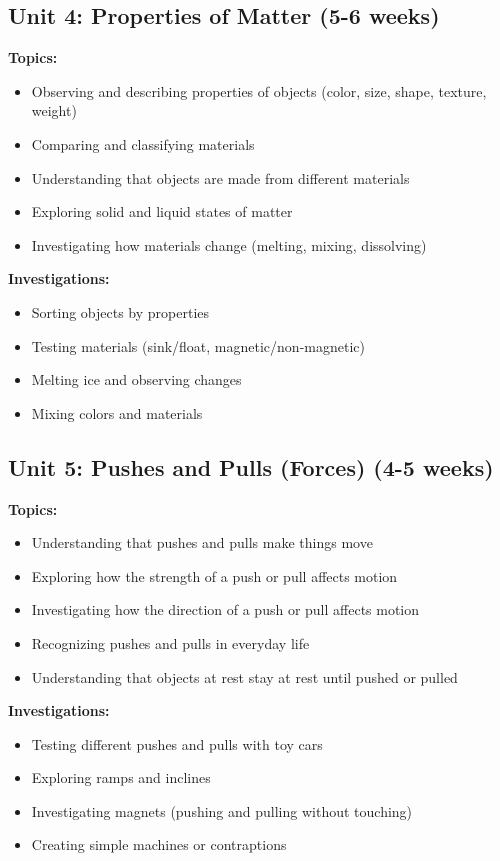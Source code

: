 \documentclass[11pt,letterpaper]{report}
\begin{document}
\subsection{Unit 4: Properties of Matter (5-6 weeks)}

\textbf{Topics:}
\begin{itemize}
    \item Observing and describing properties of objects (color, size, shape, texture, weight)
    \item Comparing and classifying materials
    \item Understanding that objects are made from different materials
    \item Exploring solid and liquid states of matter
    \item Investigating how materials change (melting, mixing, dissolving)
\end{itemize}

\textbf{Investigations:}
\begin{itemize}
    \item Sorting objects by properties
    \item Testing materials (sink/float, magnetic/non-magnetic)
    \item Melting ice and observing changes
    \item Mixing colors and materials
\end{itemize}

\subsection{Unit 5: Pushes and Pulls (Forces) (4-5 weeks)}

\textbf{Topics:}
\begin{itemize}
    \item Understanding that pushes and pulls make things move
    \item Exploring how the strength of a push or pull affects motion
    \item Investigating how the direction of a push or pull affects motion
    \item Recognizing pushes and pulls in everyday life
    \item Understanding that objects at rest stay at rest until pushed or pulled
\end{itemize}

\textbf{Investigations:}
\begin{itemize}
    \item Testing different pushes and pulls with toy cars
    \item Exploring ramps and inclines
    \item Investigating magnets (pushing and pulling without touching)
    \item Creating simple machines or contraptions
\end{itemize}
\end{document}
